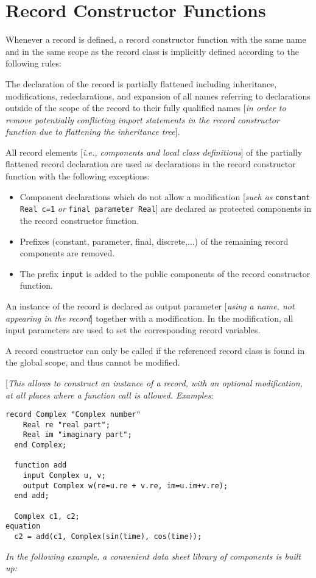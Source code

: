 \section{Record Constructor Functions}

Whenever a record is defined, a record constructor function with the
same name and in the same scope as the record class is implicitly
defined according to the following rules:

The declaration of the record is partially flattened including
inheritance, modifications, redeclarations, and expansion of all names
referring to declarations outside of the scope of the record to their
fully qualified names {[}\emph{in order to remove potentially
conflicting import statements in the record constructor function due to
flattening the inheritance tree}{]}.

All record elements {[}\emph{i.e., components and local class
definitions}{]} of the partially flattened record declaration are used
as declarations in the record constructor function with the following
exceptions:

\begin{itemize}
\item
  Component declarations which do not allow a modification {[}\emph{such
  as} \lstinline!constant Real c=1! \emph{or} \lstinline!final parameter Real!{]} are declared
  as protected components in the record constructor function.
\item
  Prefixes (constant, parameter, final, discrete,...) of the remaining
  record components are removed.
\item
  The prefix \lstinline!input! is added to the public components of the record
  constructor function.
\end{itemize}

An instance of the record is declared as output parameter {[}\emph{using
a name, not appearing in the record}{]} together with a modification. In
the modification, all input parameters are used to set the corresponding
record variables.

A record constructor can only be called if the referenced record class
is found in the global scope, and thus cannot be modified.

{[}\emph{This allows to construct an instance of a record, with an
optional modification, at all places where a function call is allowed.
Examples}:

\begin{lstlisting}[language=modelica]
  record Complex "Complex number"
    Real re "real part";
    Real im "imaginary part";
  end Complex;

  function add
    input Complex u, v;
    output Complex w(re=u.re + v.re, im=u.im+v.re);
  end add;

  Complex c1, c2;
equation
  c2 = add(c1, Complex(sin(time), cos(time));
\end{lstlisting}
\emph{In the following example, a convenient data sheet library of
components is built up:}

